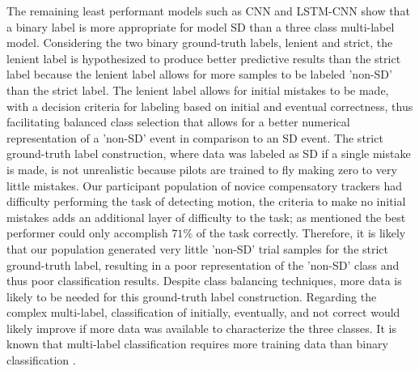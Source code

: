 \documentclass{ieeeaccess}
\begin{document}
The remaining least performant models such as CNN and LSTM-CNN show that a binary label is more appropriate for model SD than a three class multi-label model. Considering the two binary ground-truth labels, lenient and strict, the lenient label is hypothesized to produce better predictive results than the strict label because the lenient label allows for more samples to be labeled 'non-SD' than the strict label. The lenient label allows for initial mistakes to be made, with a decision criteria for labeling based on initial and eventual correctness, thus facilitating balanced class selection that allows for a better numerical representation of a 'non-SD' event in comparison to an SD event. The strict ground-truth label construction, where data was labeled as SD if a single mistake is made, is not unrealistic because pilots are trained to fly making zero to very little mistakes. Our participant population of novice compensatory trackers had difficulty performing the task of detecting motion, the criteria to make no initial mistakes adds an additional layer of difficulty to the task; as mentioned the best performer could only accomplish $71\%$ of the task correctly. Therefore, it is likely that our population generated very little 'non-SD' trial samples for the strict ground-truth label, resulting in a poor representation of the 'non-SD' class and thus poor classification results. Despite class balancing techniques, more data is likely to be needed for this ground-truth label construction. Regarding the complex multi-label, classification of initially, eventually, and not correct would likely improve if more data was available to characterize the three classes. It is known that multi-label classification requires more training data than binary classification \cite{Ng_2021_Deep_learning_specialization}.
\end{document}
